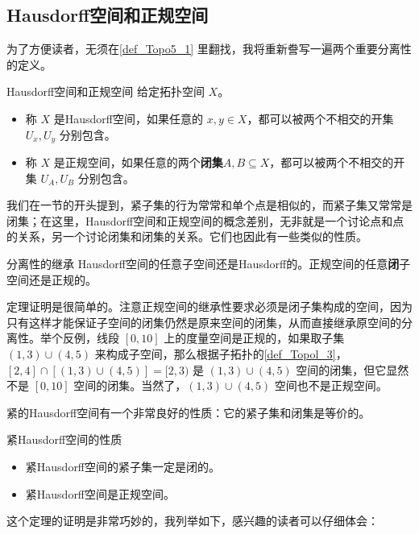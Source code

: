 \subsection{Hausdorff空间和正规空间}

为了方便读者，无须在\autoref{def_Topo5_1} 里翻找，我将重新誊写一遍两个重要分离性的定义。

\begin{definition}{Hausdorff空间和正规空间}\label{def_Topo5_2}
给定拓扑空间 $X$。
\begin{itemize}
\item 称 $X$ 是Hausdorff空间，如果任意的 $x,y\in X$，都可以被两个不相交的开集 $U_x, U_y$ 分别包含。
\item 称 $X$ 是正规空间，如果任意的两个\textbf{闭集}$A, B\subseteq X$，都可以被两个不相交的开集 $U_A, U_B$ 分别包含。
\end{itemize}
\end{definition}

我们在一节的开头提到，紧子集的行为常常和单个点是相似的，而紧子集又常常是闭集；在这里，Hausdorff空间和正规空间的概念差别，无非就是一个讨论点和点的关系，另一个讨论闭集和闭集的关系。它们也因此有一些类似的性质。

\begin{theorem}{分离性的继承}
Hausdorff空间的任意子空间还是Hausdorff的。正规空间的任意\textbf{闭}子空间还是正规的。
\end{theorem}

定理证明是很简单的。注意正规空间的继承性要求必须是闭子集构成的空间，因为只有这样才能保证子空间的闭集仍然是原来空间的闭集，从而直接继承原空间的分离性。举个反例，线段 $[0,10]$ 上的度量空间是正规的，如果取子集 $(1,3)\cup(4,5)$ 来构成子空间，那么根据子拓扑的\autoref{def_Topol_3}，$[2,4]\cap[(1,3)\cup(4,5)]=[2,3)$ 是 $(1,3)\cup(4,5)$ 空间的闭集，但它显然不是 $[0,10]$ 空间的闭集。当然了，$(1,3)\cup(4,5)$ 空间也不是正规空间。

紧的Hausdorff空间有一个非常良好的性质：它的紧子集和闭集是等价的。
\begin{theorem}{紧Hausdorff空间的性质}
\begin{itemize}
\item 紧Hausdorff空间的紧子集一定是闭的。
\item 紧Hausdorff空间是正规空间。

\end{itemize}
\end{theorem}

这个定理的证明是非常巧妙的，我列举如下，感兴趣的读者可以仔细体会：


